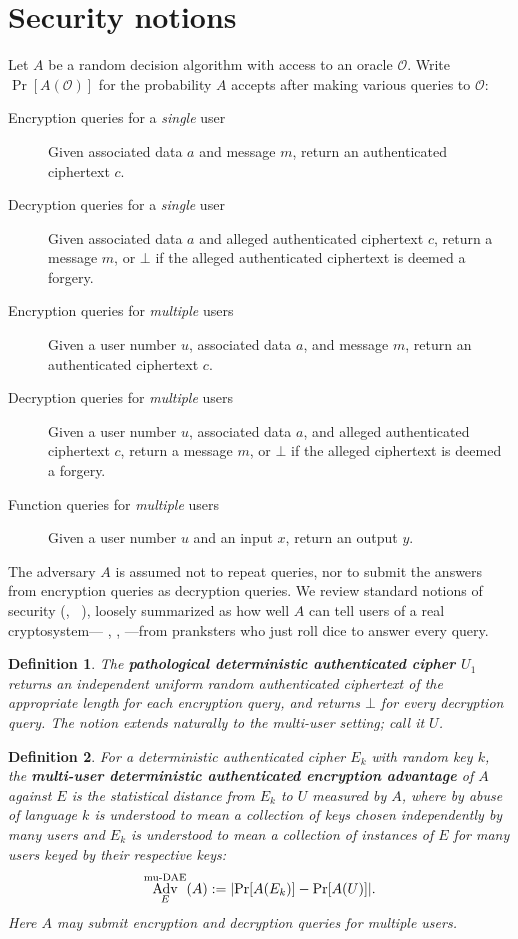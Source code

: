 \documentclass[draft]{article}
\newtheorem{definition}{Definition}
\newcommand{\term}[1]{\textbf{#1}}
\def\operatorsc#1{{%
  \ifmmode\let\next=\operatorname\else\let\next=\relax\fi\next{\textsc{#1}}}}
\def\XSalsa#1/{\operatorsc{XSalsa#1}}
\def\Daence/{\operatorsc{Daence}}
\def\muDAE{%
  \ifmmode\def\next{\operatorname{mu-DAE}}%
    \else\def\next/{mu-\textsc{dae}}%
  \fi\next}
\DeclareMathOperator{\Adv}{Adv}
\begin{document}
\section{Security notions}

Let $A$ be a random decision algorithm with access to an oracle
 $\mathcal O$.
Write $\Pr[A(\mathcal O)]$ for the probability $A$ accepts after
 making various queries to $\mathcal O$:
%
\begin{description}
  \item[Encryption queries for a \emph{single} user]
    Given associated data $a$ and message $m$, return an authenticated
     ciphertext $c$.
  \item[Decryption queries for a \emph{single} user]
    Given associated data $a$ and alleged authenticated ciphertext
     $c$, return a message $m$, or $\bot$ if the alleged authenticated
     ciphertext is deemed a forgery.
  \item[Encryption queries for \emph{multiple} users]
    Given a user number $u$, associated data $a$, and message $m$,
     return an authenticated ciphertext $c$.
  \item[Decryption queries for \emph{multiple} users]
    Given a user number $u$, associated data $a$, and alleged
     authenticated ciphertext $c$, return a message $m$, or $\bot$ if
     the alleged ciphertext is deemed a forgery.
  \item[Function queries for \emph{multiple} users]
    Given a user number $u$ and an input $x$, return an output $y$.
\end{description}
%
The adversary $A$ is assumed not to repeat queries, nor to submit the
 answers from encryption queries as decryption queries.
We review standard notions of security
 (\eg,~%
  \cite[Definition~1]{rogaway-shrimpton2006keywrap}%
  \cite[\S3]{bellare-tackmann2016mu-ae-crypto}),
 loosely summarized as how well $A$ can tell users of a real
 cryptosystem---\Daence/, \XSalsa20/, \etc---from pranksters who just
 roll dice to answer every query.

\begin{definition}
  The \term{pathological deterministic authenticated cipher $U_1$}
   returns an independent uniform random authenticated ciphertext of
   the appropriate length for each encryption query, and returns
   $\bot$ for every decryption query.
  The notion extends naturally to the multi-user setting; call it
   $U$.
\end{definition}

\begin{definition}
  For a deterministic authenticated cipher $E_k$ with random key $k$,
   the
   \term{multi-user deterministic authenticated encryption advantage}
   of $A$ against $E$ is the statistical distance from $E_k$ to $U$
   measured by $A$, where by abuse of language $k$ is understood to
   mean a collection of keys chosen independently by many users and
   $E_k$ is understood to mean a collection of instances of $E$ for
   many users keyed by their respective keys:
  \[
    \Adv^{\muDAE}_E(A) := \lvert\Pr[A(E_k)] - \Pr[A(U)]\rvert.
  \]
  Here $A$ may submit encryption and decryption queries for
   \emph{multiple} users.
\end{definition}
\end{document}
